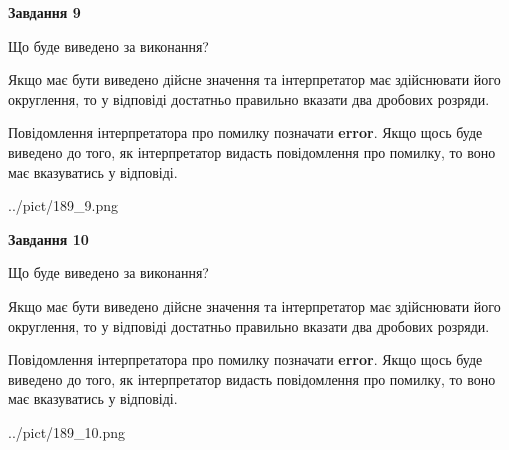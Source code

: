 \documentclass[12pt, ukrainian]{article}
\begin{document}
{\begin {Large}
{\begin {center}\textbf{Завдання 9}\end {center}}\par
Що буде виведено за виконання? \par

Якщо має бути виведено дійсне значення та інтерпретатор має здійснювати його округлення, 
то у відповіді достатньо правильно вказати два дробових розряди.

Повідомлення інтерпретатора про помилку позначати \textbf{error}.
Якщо щось буде виведено до того, як інтерпретатор видасть повідомлення про помилку, 
то воно має вказуватись у відповіді. \par

\begin{center}
	{../pict/189_9.png}
\end{center}
\newpage

{\begin {center}\textbf{Завдання 10}\end {center}}\par
Що буде виведено за виконання? \par

Якщо має бути виведено дійсне значення та інтерпретатор має здійснювати його округлення, 
то у відповіді достатньо правильно вказати два дробових розряди.

Повідомлення інтерпретатора про помилку позначати \textbf{error}.
Якщо щось буде виведено до того, як інтерпретатор видасть повідомлення про помилку, 
то воно має вказуватись у відповіді. \par

\begin{center}
	{../pict/189_10.png}
\end{center}
\newpage

\end {Large}}
\end{document}
